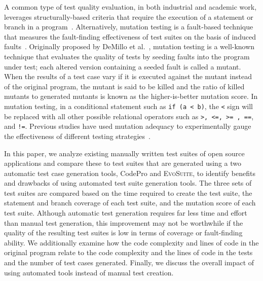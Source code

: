
A common type of test quality evaluation, in both industrial and academic work, leverages structurally-based criteria that require the execution of a statement or branch in a program~\cite{weyuker1988evaluation}.  Alternatively, mutation testing is a fault-based technique that measures the fault-finding effectiveness of test suites on the basis of induced faults~\cite{demillo1978hints, hamlet1977testing}.  Originally proposed by DeMillo et al.~\cite{demillo1978hints}, mutation testing is a well-known technique that evaluates the quality of tests by seeding faults into the program under test; each altered version containing a seeded fault is called a mutant. When the results of a test case vary if it is executed against the mutant instead of the original program, the mutant is said to be killed and the ratio of killed mutants to generated mutants is known as the higher-is-better mutation score. In mutation testing, in a conditional statement such as \texttt{if (a < b)}, the \texttt{<} sign will be replaced with all other possible relational operators such as \texttt{>, <=, >= , ==}, and \texttt{!=}. Previous studies have used mutation adequacy to experimentally gauge the effectiveness of different testing strategies~\cite{andrews2005mutation,andrews2006,do2006,just2014}.  




In this paper, we analyze existing manually written test suites of open source applications and compare these to test
suites that are generated using a two automatic test case generation tools, CodePro and \textsc{EvoSuite}, to identify
benefits and drawbacks of using automated test suite generation tools.  The three sets of test suites are compared based
on the time required to create the test suite, the statement and branch coverage of each test suite, and the mutation
score of each test suite.  Although automatic test generation requires far less time and effort than manual test
generation, this improvement may not be worthwhile if the quality of the resulting test suites is low in terms of
coverage or fault-finding ability.  We additionally examine how the code complexity and lines of code in the original
program relate to the code complexity and the lines of code in the tests and the number of test cases generated.
Finally, we discuss the overall impact of using automated tools instead of manual test creation.

